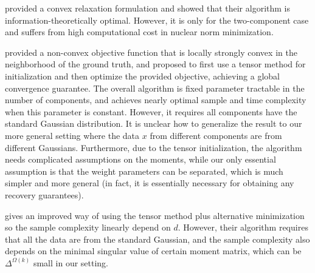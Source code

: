 \citep{chen2014convex} provided a convex relaxation formulation and showed that their algorithm is information-theoretically optimal. However, it is only for the two-component case and suffers from high computational cost in nuclear norm minimization. 

\citep{zhong2016mixed} provided a non-convex objective function that is locally strongly convex in the neighborhood of the ground truth, and proposed to first use a tensor method for initialization and then optimize the provided objective, achieving a global convergence guarantee. The overall algorithm is fixed parameter tractable in the number of components, and achieves nearly optimal sample and time complexity when this parameter is constant. However, it requires all components have the standard Gaussian distribution. It is unclear how to generalize the result to our more general setting where the data $x$ from different components are from different Gaussians. Furthermore, due to the tensor initialization, the algorithm needs complicated assumptions on the moments, while our only essential assumption is that the weight parameters can be separated, which is much simpler and more general (in fact, it is essentially necessary for obtaining any recovery guarantees).

\citep{yi2016solving} gives an improved way of using the tensor method plus alternative minimization so the sample complexity linearly depend on $d$. However, their algorithm  requires that all the data are from the standard Gaussian, and the sample complexity also depends on the minimal singular value of certain moment matrix, which can be $ \Delta^{\Omega(k)}$ small in our setting. 
